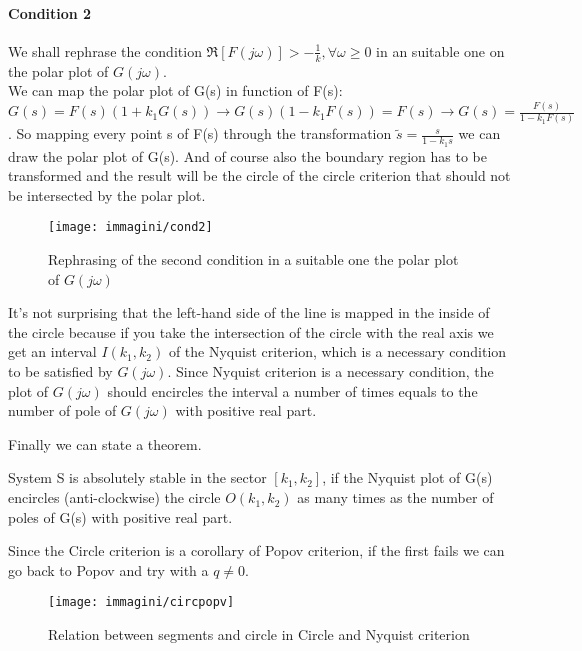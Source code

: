 \paragraph{Condition 2} We shall rephrase the condition $\Re[F(j\omega)]>-\frac{1}{k}, \forall \omega \ge0$ in an suitable one on the polar plot of $G(j\omega)$.\\
We can map the polar plot of G(s) in function of F(s): $G(s)=F(s)(1+k_1G(s))\to G(s)(1-k_1F(s))=F(s)\to G(s)=\frac{F(s)}{1-k_1F(s)}$. So mapping every point s of F(s) through the transformation $\tilde{s}=\frac{s}{1-k_1s}$ we can draw the polar plot of G(s). And of course also the boundary region has to be transformed and the result will be the circle of the circle criterion that should not be intersected by the polar plot.
\begin{figure}[H]
	\centering
	\texttt{[image: immagini/cond2]}
	\caption{Rephrasing of the second condition in a suitable one the polar plot of $G(j\omega)$}
	\label{fig:cond2}
\end{figure}
\begin{note}
	It's not surprising that the left-hand side of the  line is mapped in the inside of the circle because if you take the intersection of the circle with the real axis we get an interval $I(k_1,k_2)$ of the Nyquist criterion, which is a necessary condition to be satisfied by $G(j\omega)$. Since Nyquist criterion is a necessary condition, the plot of $G(j\omega)$ should encircles the interval a number of times equals to the number of pole of $G(j\omega)$ with positive real part. 
\end{note}
Finally we can state a theorem.
\begin{thm}
	System S is absolutely stable in the sector $[k_1,k_2]$, if the Nyquist plot of G(s) encircles (anti-clockwise) the circle $O(k_1, k_2)$ as many times as the number of poles of G(s) with positive real part.
\end{thm}
\begin{note}
	Since the Circle criterion is a corollary of Popov criterion, if the first fails we can go back to Popov and try with a $q\neq 0$.
\end{note}
\begin{figure}[H]
	\centering
	\texttt{[image: immagini/circpopv]}
	\caption{Relation between segments and circle in Circle and Nyquist criterion}
	\label{fig:circpopv}
\end{figure}
